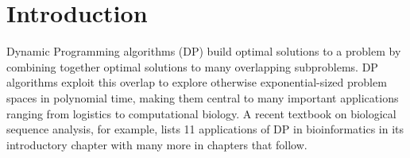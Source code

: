 \section{Introduction}
\label{intro}


\newcommand{\xidx}{i}
\newcommand{\yidx}{j}
\newcommand{\xw}[1]{w_{#1}}
\newcommand{\yw}[1]{w'_{#1}}

Dynamic Programming algorithms (DP) build optimal solutions to a problem by combining
together optimal solutions to many overlapping subproblems.  DP
algorithms exploit this overlap to explore otherwise exponential-sized
problem spaces in polynomial time, making them central to many
important applications ranging from logistics to computational
biology. A recent textbook \cite{DurbinEdKr98} on biological sequence analysis, for example,
lists 11 applications of DP in bioinformatics in its introductory
chapter with many more in chapters that follow.


